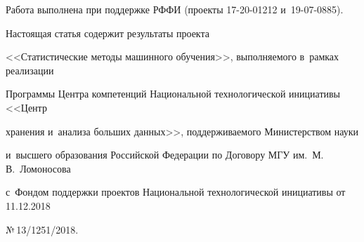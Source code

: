 {\renewcommand{\thefootnote}{\fnsymbol{footnote}}

\footnotetext[1]

{Работа выполнена при поддержке РФФИ (проекты 17-20-01212 и~19-07-0885). 

Настоящая статья содержит результаты проекта 

<<Статистические методы машинного обучения>>, выполняемого в~рамках реализации 

Программы Центра компетенций Национальной технологической инициативы <<Центр 

хранения и~анализа больших данных>>, поддерживаемого Министерством науки 

и~высшего образования Российской Федерации по Договору МГУ им.\ М.\,В.~Ломоносова  

с~Фондом поддержки проектов Национальной технологической инициативы от 11.12.2018 

№\,13/1251/2018.}}



\renewcommand{\thefootnote}{\arabic{footnote}}







 \label{st\stat}



                  \thispagestyle{headings}

                  

  \vspace*{-18pt}









